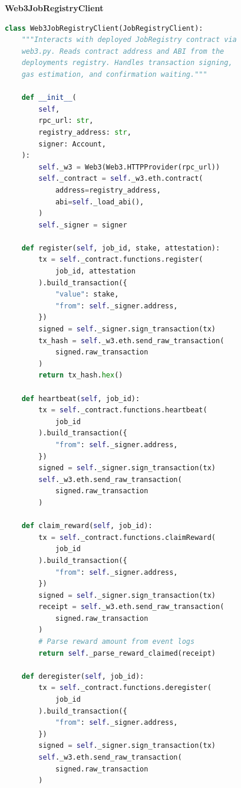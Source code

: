 \documentclass[11pt,a4paper]{article}
\begin{document}
\begin{contractbox}
\textbf{Web3JobRegistryClient}
\begin{lstlisting}[language=Python]
class Web3JobRegistryClient(JobRegistryClient):
    """Interacts with deployed JobRegistry contract via
    web3.py. Reads contract address and ABI from the
    deployments registry. Handles transaction signing,
    gas estimation, and confirmation waiting."""

    def __init__(
        self,
        rpc_url: str,
        registry_address: str,
        signer: Account,
    ):
        self._w3 = Web3(Web3.HTTPProvider(rpc_url))
        self._contract = self._w3.eth.contract(
            address=registry_address,
            abi=self._load_abi(),
        )
        self._signer = signer

    def register(self, job_id, stake, attestation):
        tx = self._contract.functions.register(
            job_id, attestation
        ).build_transaction({
            "value": stake,
            "from": self._signer.address,
        })
        signed = self._signer.sign_transaction(tx)
        tx_hash = self._w3.eth.send_raw_transaction(
            signed.raw_transaction
        )
        return tx_hash.hex()

    def heartbeat(self, job_id):
        tx = self._contract.functions.heartbeat(
            job_id
        ).build_transaction({
            "from": self._signer.address,
        })
        signed = self._signer.sign_transaction(tx)
        self._w3.eth.send_raw_transaction(
            signed.raw_transaction
        )

    def claim_reward(self, job_id):
        tx = self._contract.functions.claimReward(
            job_id
        ).build_transaction({
            "from": self._signer.address,
        })
        signed = self._signer.sign_transaction(tx)
        receipt = self._w3.eth.send_raw_transaction(
            signed.raw_transaction
        )
        # Parse reward amount from event logs
        return self._parse_reward_claimed(receipt)

    def deregister(self, job_id):
        tx = self._contract.functions.deregister(
            job_id
        ).build_transaction({
            "from": self._signer.address,
        })
        signed = self._signer.sign_transaction(tx)
        self._w3.eth.send_raw_transaction(
            signed.raw_transaction
        )
\end{lstlisting}
\end{contractbox}
\end{document}
